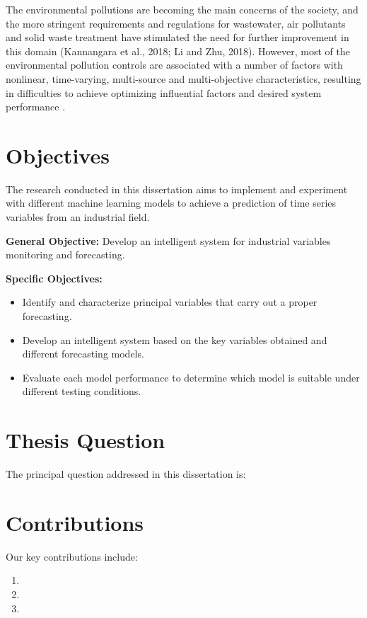The environmental pollutions are becoming the main concerns of the society, and the more stringent requirements and regulations for wastewater, air pollutants and solid waste treatment have stimulated the need for further improvement in this domain (Kannangara et al., 2018; Li and Zhu, 2018). However, most of the environmental pollution controls are associated with a number of factors with nonlinear, time-varying, multi-source and multi-objective characteristics, resulting in difficulties to achieve optimizing influential factors and desired system performance \cite{Ye2020}.

\section{Objectives}
\label{s:Objectives}
The research conducted in this dissertation aims to implement and experiment with different machine learning models to achieve a prediction of time series variables from an industrial field.


\textbf{General Objective:} Develop an intelligent system for industrial variables monitoring and forecasting.

\textbf{Specific Objectives:}

\begin{itemize}
\item Identify and characterize principal variables that carry out a proper forecasting.
\item Develop an intelligent system based on the key variables obtained and different forecasting models.
\item Evaluate each model performance to determine which model is suitable under different testing conditions.
\end{itemize}

\section{Thesis Question}
\label{s:Question}
The principal question addressed in this dissertation is:


\section{Contributions}
\label{s:Contributions}

Our key contributions include:

\begin{enumerate}

  \item {}
  
  \item {}
  
  \item {}

\end{enumerate}

